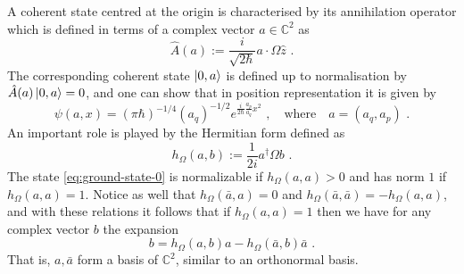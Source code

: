 \documentclass[12pt]{iopart} %
\begin{document}
A coherent state centred at the origin is characterised by its annihilation operator which is defined in terms of a complex vector $a\in \mathbb{C}^2$ as
\begin{equation}
\hat A(a):=\frac{i}{\sqrt{2\hbar}} a\cdot \Omega \hat z\,\, .
\end{equation}
The corresponding coherent state $\ket{0,a}$ is defined up to normalisation by $\hat A(a)\ket{0,a}=0$, and one can show that in position representation it is given by 
\begin{equation}\label{eq:ground-state-0}
\psi(a,x)=(\pi\hbar)^{-1/4}(a_q)^{-1/2}e^{\frac{i}{2\hbar} \frac{a_p}{a_q} x^2}\,\, , \quad \text{where}\quad a=(a_q,a_p)\,\, .
\end{equation}
An important role is played by the Hermitian form defined as 
\begin{equation}\label{eq:def-h}
h_{\Omega}(a,b):=\frac{1}{2i} a^{\dagger}\Omega b\,\, .
\end{equation}
The state \eqref{eq:ground-state-0} is normalizable  if $h_{\Omega}(a,a)>0$ and has norm $1$  if $h_{\Omega}(a,a)=1$. Notice as well that $h_{\Omega}( \bar{a},a)=0$ and $h_{\Omega}( \bar{a},\bar{a})=-h_{\Omega}(a,a)$, and with these relations it follows that if $h_{\Omega}(a,a)=1$ then we have for any complex vector $b$ the expansion
\begin{equation}\label{eq:expansion-h}
b=h_{\Omega}(a,b)a-h_{\Omega}( \bar{a}, b) \bar{a}\,\, .
\end{equation}
That is, $a, \bar{a}$ form a basis of $\mathbb{C}^2$, similar to an orthonormal basis.  
\end{document}
